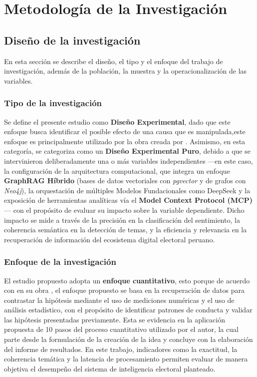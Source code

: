\chapter{Metodología de la Investigación}
 
\section{Diseño de la investigación}
 
En esta sección se describe el diseño, el tipo y el enfoque del trabajo de investigación, además de la población, la muestra y la operacionalización de las variables.
 
\subsection{Tipo de la investigación}
 
Se define el presente estudio como \textbf{Diseño Experimental}, dado que este enfoque busca identificar el posible efecto de una causa que es manipulada,este enfoque es principalmente utilizado por la obra  creada por \cite{bk_hernandez2014metodologia}. Asimismo, en esta categoría, se categoriza como un \textbf{Diseño Experimental Puro}, debido a que se intervinieron deliberadamente una o más variables independientes —en este caso, la configuración de la arquitectura computacional, que integra un enfoque \textbf{GraphRAG Híbrido} (bases de datos vectoriales con \textit{pgvector} y de grafos con \textit{Neo4j}), la orquestación de múltiples Modelos Fundacionales como  DeepSeek y la exposición de herramientas analíticas vía el \textbf{Model Context Protocol (MCP)}— con el propósito de evaluar su impacto sobre la variable dependiente. Dicho impacto se mide a través de la precisión en la clasificación del sentimiento, la coherencia semántica en la detección de temas, y la eficiencia y relevancia en la recuperación de información del ecosistema digital electoral peruano.


\subsection{Enfoque de la investigación}
 
El estudio propuesto adopta un \textbf{enfoque cuantitativo}, esto porque de acuerdo con \cite{bk_hernandez2014metodologia} en su obra , el enfoque  propuesto se basa en la recuperación de datos para contrastar la hipótesis mediante el uso de mediciones numéricas y el uso de análisis estadístico, con el propósito de identificar patrones de conducta y validar las hipótesis presentadas previamente. Esta se evidencia en la aplicación propuesta de 10 pasos del proceso cuantitativo utilizado por el autor, la cual parte desde la formulación de la creación de la idea y concluye con la elaboración del informe de resultados. En este trabajo, indicadores como la exactitud, la coherencia temática y la latencia de procesamiento permiten evaluar de manera objetiva el desempeño del sistema de inteligencia electoral planteado.
 
